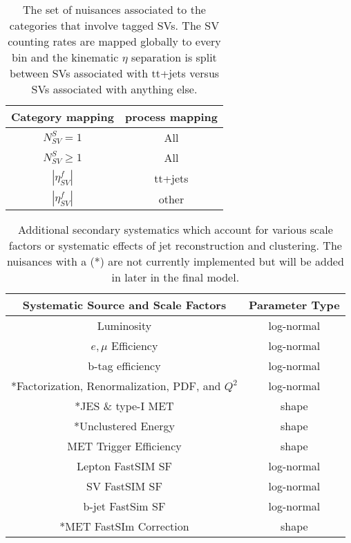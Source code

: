 \begin{table}
\centering
\caption{The set of nuisances associated to the categories that involve tagged SVs. The SV counting rates are mapped globally to every bin and the kinematic $\eta$ separation is split between SVs associated with tt+jets versus SVs associated with anything else.}
\begin{tabular}{cc}
Category mapping & process mapping \\ 
\hline 
\hline
$N_{SV}^S=1$ & All \\ 
 
$N_{SV}^S \geq 1$ & All \\ 
 
$|\eta_{SV}^f|$ & tt+jets \\ 
 
$|\eta_{SV}^f|$ & other \\ 
\hline 
\end{tabular} 
\label{tab:svnuisance}

\end{table}

\begin{table}
\centering
\caption{Additional secondary systematics which account for various scale factors or systematic effects of jet reconstruction and clustering.  The nuisances with a (*) are not currently implemented but will be added in later in the final model. }
\begin{tabular}{|c|c|}
\hline 
Systematic Source and Scale Factors & Parameter Type \\ 
\hline 
Luminosity & log-normal \\  
$e,\mu$ Efficiency & log-normal \\ 
b-tag efficiency & log-normal \\ 
*Factorization, Renormalization, PDF, and $Q^2$ & log-normal \\ 
*JES \& type-I MET & shape \\ 
*Unclustered Energy & shape \\ 
MET Trigger Efficiency & shape \\ 
Lepton FastSIM SF & log-normal \\ 
SV FastSIM SF & log-normal \\ 
b-jet FastSim SF & log-normal \\ 
*MET FastSIm Correction & shape \\ 
\hline 
\end{tabular} 
\label{tab:othernuisance}

\end{table}

